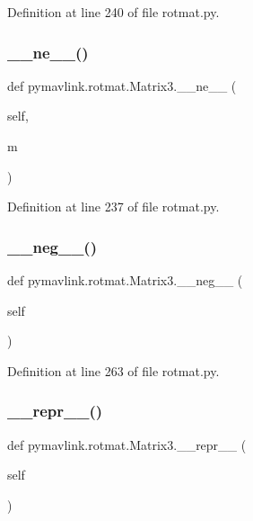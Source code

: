 Definition at line 240 of file rotmat.\+py.

\mbox{\label{classpymavlink_1_1rotmat_1_1Matrix3_af0dd6907c51e35d254b7e78b3ab153f2}} 
\subsubsection{\texorpdfstring{\_\_ne\_\_()}{\_\_ne\_\_()}}
{\footnotesize\ttfamily def pymavlink.\+rotmat.\+Matrix3.\+\_\+\+\_\+ne\+\_\+\+\_\+ (\begin{DoxyParamCaption}\item[{}]{self,  }\item[{}]{m }\end{DoxyParamCaption})}



Definition at line 237 of file rotmat.\+py.

\mbox{\label{classpymavlink_1_1rotmat_1_1Matrix3_a52ca10cafc20362cc59aa47dec8733e8}} 
\subsubsection{\texorpdfstring{\_\_neg\_\_()}{\_\_neg\_\_()}}
{\footnotesize\ttfamily def pymavlink.\+rotmat.\+Matrix3.\+\_\+\+\_\+neg\+\_\+\+\_\+ (\begin{DoxyParamCaption}\item[{}]{self }\end{DoxyParamCaption})}



Definition at line 263 of file rotmat.\+py.

\mbox{\label{classpymavlink_1_1rotmat_1_1Matrix3_abfd504b096110e23400b43cc19ef53a3}} 
\subsubsection{\texorpdfstring{\_\_repr\_\_()}{\_\_repr\_\_()}}
{\footnotesize\ttfamily def pymavlink.\+rotmat.\+Matrix3.\+\_\+\+\_\+repr\+\_\+\+\_\+ (\begin{DoxyParamCaption}\item[{}]{self }\end{DoxyParamCaption})}




